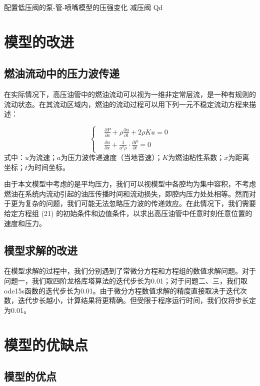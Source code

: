\documentclass[withoutpreface,bwprint]{cumcmthesis} %
\begin{document}
			配置低压阀的泵­-管-­喷嘴模型的压强变化
			减压阀
			Qd
			
			\section{模型的改进}
			
			\subsection{燃油流动中的压力波传递}
			
			在实际情况下，高压油管中的燃油流动可以视为一维非定常层流，是一种有规则的流动状态。在其流动区域内，燃油的流动过程可以用下列一元不稳定流动方程\cite{bib:five}来描述：
			
			\begin{equation}
			\left\{
			\begin{aligned}
			&\frac{\partial P}{\partial x} + \rho \frac{\partial u}{\partial t} + 2 \rho K u = 0 \\
			&\frac{\partial u}{\partial x} + \frac{1}{a^2 \rho} \cdot \frac{\partial P}{\partial t} = 0
			\end{aligned}
			\right.
			\end{equation}
			式中：$u$为流速；$a$为压力波传递速度（当地音速）；$K$为燃油粘性系数；$x$为距离坐标；$t$为时间坐标。
			
			由于本文模型中考虑的是平均压力，我们可以视模型中各腔均为集中容积，不考虑燃油在系统内流动引起的油压传播时间和流动损失，即腔内压力处处相等。然而对于更为复杂的问题，我们可能无法忽略压力波的传递效应。在此情况下，我们需要给定方程组 (21) 的初始条件和边值条件，以求出高压油管中任意时刻任意位置的速度和压力。
			
			\subsection{模型求解的改进}
			
			在模型求解的过程中，我们分别遇到了常微分方程和方程组的数值求解问题。对于问题一，我们取四阶龙格库塔算法的迭代步长为0.01；对于问题二、三，我们取ode15s函数的迭代步长为0.01。由于微分方程数值求解的精度直接取决于迭代次数，迭代步长越小，计算结果将更精确。但受限于程序运行时间，我们仅将步长定为0.01。
			
			\section{模型的优缺点}
			\subsection{模型的优点}
			
\end{document}
